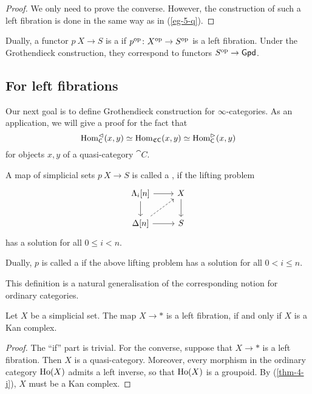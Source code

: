 \begin{proof}
    We only need to prove the converse.
    However, the construction of such a left fibration
    is done in the same way as in (\ref{eg-5-q}).
\end{proof}

Dually, a functor $p\:X\to S$ is a 
if $p^{\mathrm{op}}\colon X^{\mathrm{op}}\to S^{\mathrm{op}}$ is a left fibration.
Under the Grothendieck construction,
they correspond to functors $S^{\mathrm{op}}\to\mathsf{Gpd}$.

\subsection{For left fibrations}

Our next goal is to define Grothendieck construction
for $\infty$-categories.
As an application,
we will give a proof for the fact that 
\[\operatorname{Hom}_{\mathsf{C}}^{\vartriangleleft}(x,y)\simeq\operatorname{Hom}_{\mathfrak C\mathsf{C}}(x,y)
\simeq\operatorname{Hom}_{\mathsf{C}}^{\vartriangleright}(x,y)\]
for objects $x,y$ of a quasi-category $\cat C$.

\begin{definition}
    A map of simplicial sets $p\:X\to S$ is called a ,
    if the lifting problem 
    \[\begin{tikzcd}
        \Lambda_i[n] \ar[d] \ar[r] & X \ar[d] \\
        \Delta[n] \ar[r] \ar[ur,dashed] & S
    \end{tikzcd}\]
    has a solution for all $0\leq i<n$.

    Dually, $p$ is called a 
    if the above lifting problem has a solution for all $0<i\leq n$.
\end{definition}

This definition is a natural generalisation
of the corresponding notion for ordinary categories.

\begin{proposition}
    Let $X$ be a simplicial set.
    The map $X\to*$ is a left fibration,
    if and only if $X$ is a Kan complex.
\end{proposition}

\begin{proof}
    The ``if'' part is trivial.
    For the converse, suppose that $X\to*$ is a left fibration.
    Then $X$ is a quasi-category.
    Moreover, every morphism in the ordinary category $\operatorname{Ho}(X)$ admits a left inverse,
    so that $\operatorname{Ho}(X)$ is a groupoid.
    By (\ref{thm-4-j}), $X$ must be a Kan complex.
\end{proof}

